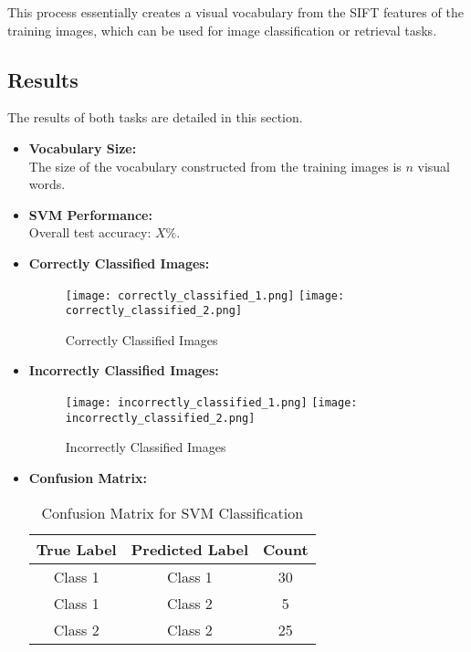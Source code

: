 \documentclass{article}
\begin{document}
   This process essentially creates a visual vocabulary from the SIFT features of the training images, which can be used for image classification or retrieval tasks.



\subsection{Results}
The results of both tasks are detailed in this section.
\begin{itemize}
    \item \textbf{Vocabulary Size:} \\
    The size of the vocabulary constructed from the training images is \( n \) visual words.

    \item \textbf{SVM Performance:} \\
    Overall test accuracy: \( X\% \).

    \item \textbf{Correctly Classified Images:} \\
    \begin{figure}[H]
        \centering
        \texttt{[image: correctly\_classified\_1.png]} %
        \texttt{[image: correctly\_classified\_2.png]} %
        \caption{Correctly Classified Images}
    \end{figure}

    \item \textbf{Incorrectly Classified Images:} \\
    \begin{figure}[h]
        \centering
        \texttt{[image: incorrectly\_classified\_1.png]} %
        \texttt{[image: incorrectly\_classified\_2.png]} %
        \caption{Incorrectly Classified Images}
    \end{figure}

    \item \textbf{Confusion Matrix:} \\
    \begin{table}[h]
        \centering
        \begin{tabular}{@{}ccc@{}}
            \toprule
            True Label & Predicted Label & Count \\ \midrule
            Class 1    & Class 1        & 30   \\
            Class 1    & Class 2        & 5    \\
            Class 2    & Class 2        & 25   \\
            \bottomrule
        \end{tabular}
        \caption{Confusion Matrix for SVM Classification}
    \end{table}
\end{itemize}
\end{document}
